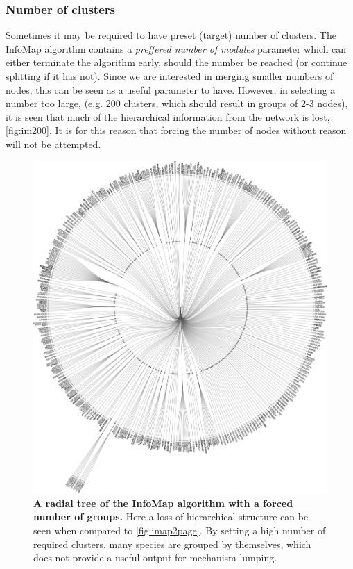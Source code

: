  \subsubsection{Number of clusters}
Sometimes it may be required to have preset (target) number of clusters. The InfoMap algorithm contains a \emph{preffered number of modules} parameter which can either terminate the algorithm early, should the number be reached (or continue splitting if it has not). Since we are interested in merging smaller numbers of nodes, this can be seen as a useful parameter to have. However, in selecting a number too large, (e.g. 200 clusters, which should result in groups of 2-3 nodes), it is seen that much of the hierarchical information from the network is lost, \autoref{fig:im200}. It is for this reason that forcing the number of nodes without reason will not be attempted.


  \begin{figure}[H]
    \centering
    \includegraphics[width=.8\textwidth]{fig/manygroups.pdf}
    \caption{\textbf{A radial tree of the InfoMap algorithm with a forced number of groups.} Here a loss of hierarchical structure can be seen when compared to \autoref{fig:imap2page}. By setting a high number of required clusters, many species are grouped by themselves, which does not provide a useful output for mechanism lumping. }
        \label{fig:im200}
  \end{figure}




















